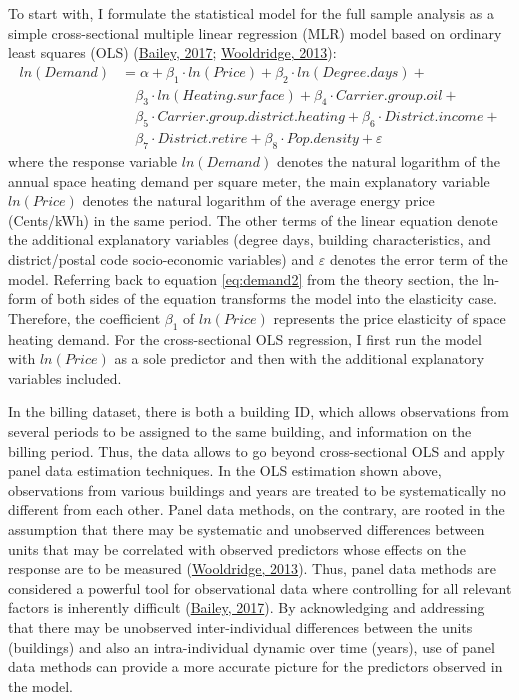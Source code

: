 \documentclass[12pt,twoside]{reedthesis}
\begin{document}
To start with, I formulate the statistical model for the full sample analysis as a simple cross-sectional multiple linear regression (MLR) model based on ordinary least squares (OLS) (\protect\hyperlink{ref-bailey17}{Bailey, 2017}; \protect\hyperlink{ref-wooldridge13}{Wooldridge, 2013}):
\begin{align*}
ln(Demand) & = \alpha + \beta_1 \cdot ln(Price) + \beta_2 \cdot ln(Degree.days) + \\
 & \quad \beta_3 \cdot ln(Heating.surface) + \beta_{4} \cdot Carrier.group.oil + \\
 & \quad \beta_{5} \cdot Carrier.group.district.heating + \beta_{6} \cdot District.income + \\
 & \quad \beta_{7} \cdot District.retire + \beta_{8} \cdot Pop.density + \varepsilon 
\end{align*}
where the response variable \(ln(Demand)\) denotes the natural logarithm of the annual space heating demand per square meter, the main explanatory variable \(ln(Price)\) denotes the natural logarithm of the average energy price (Cents/kWh) in the same period. The other terms of the linear equation denote the additional explanatory variables (degree days, building characteristics, and district/postal code socio-economic variables) and \(\varepsilon\) denotes the error term of the model. Referring back to equation \eqref{eq:demand2} from the theory section, the ln-form of both sides of the equation transforms the model into the elasticity case. Therefore, the coefficient \(\beta_1\) of \(ln(Price)\) represents the price elasticity of space heating demand. For the cross-sectional OLS regression, I first run the model with \(ln(Price)\) as a sole predictor and then with the additional explanatory variables included.

In the billing dataset, there is both a building ID, which allows observations from several periods to be assigned to the same building, and information on the billing period. Thus, the data allows to go beyond cross-sectional OLS and apply panel data estimation techniques. In the OLS estimation shown above, observations from various buildings and years are treated to be systematically no different from each other. Panel data methods, on the contrary, are rooted in the assumption that there may be systematic and unobserved differences between units that may be correlated with observed predictors whose effects on the response are to be measured (\protect\hyperlink{ref-wooldridge13}{Wooldridge, 2013}). Thus, panel data methods are considered a powerful tool for observational data where controlling for all relevant factors is inherently difficult (\protect\hyperlink{ref-bailey17}{Bailey, 2017}). By acknowledging and addressing that there may be unobserved inter-individual differences between the units (buildings) and also an intra-individual dynamic over time (years), use of panel data methods can provide a more accurate picture for the predictors observed in the model.
\end{document}
